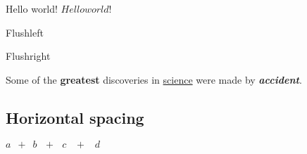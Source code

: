 \documentclass[12pt, letterpaper]{article}
\begin{document}

Hello world!
$Hello world!$ %


\begin{flushleft}
Flushleft
\end{flushleft}

\begin{flushright}
Flushright
\end{flushright}

Some of the \textbf{greatest}
discoveries in \underline{science} 
were made by \textbf{\textit{accident}}.



\subsection*{Horizontal spacing}

$a \,\,\, + \,\,\, b \:\:\:  + \:\:\: c \;\;\; + \;\;\; d $
\end{document}
